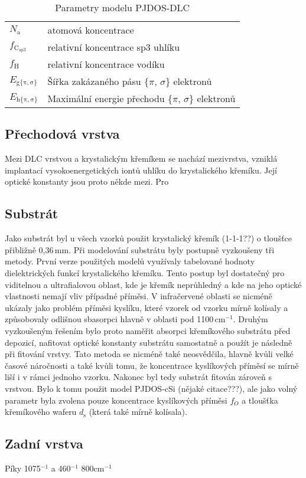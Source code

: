 \begin{table}
\centering
\begin{tabular}{l l}
\hline
$N_\mathrm{a}$ & atomová koncentrace \\
$f_\mathrm{C_{sp3}}$ & relativní koncentrace sp3 uhlíku \\
$f_\mathrm{H}$ & relativní koncentrace vodíku \\

$E_\mathrm{g\{\pi,\sigma\}}$ & Šířka zakázaného pásu \{$\pi$, $\sigma$\} elektronů\\
$E_\mathrm{h\{\pi,\sigma\}}$ & Maximální energie přechodu \{$\pi$, $\sigma$\} elektronů\\




\hline

\end{tabular}

\caption{Parametry modelu PJDOS-DLC}
\end{table}

\subsection{Přechodová vrstva}
Mezi DLC vrstvou a krystalickým křemíkem se nachází mezivrstva, vzniklá implantací vysokoenergetických iontů uhlíku do krystalického křemíku. Její optické konstanty jsou proto někde mezi. Pro  

\subsection{Substrát}
Jako substrát byl u všech vzorků použit krystalický křemík (1-1-1??) o tloušťce přibližně 0,36\,mm. Při modelování substrátu byly postupně vyzkoušeny tři metody. První verze použitých modelů využívaly tabelované hodnoty dielektrických funkcí krystalického křemíku. Tento postup byl dostatečný pro viditelnou a ultrafialovou oblast, kde je křemík neprůhledný a kde na jeho optické vlastnosti nemají vliv případné příměsi. V infračervené oblasti se nicméně ukázaly jako problém příměsi kyslíku, které vzorek od vzorku mírně kolísaly a způsobovaly odlišnou sbasorpci hlavně v oblasti pod 1100\,cm$^{-1}$. Druhým vyzkoušeným řešením bylo proto naměřit absorpci křemíkového substrátu před depozicí, nafitovat optické konstanty substrátu samostatně a použít je následně při fitování vrstvy. Tato metoda se nicméně také neosvědčila, hlavně kvůli velké časové náročnosti a také kvůli tomu, že koncentrace kyslíkových příměsí se mírně liší i v rámci jednoho vzorku.
Nakonec byl tedy substrát fitován zároveň s vrstvou. Bylo k tomu použit model PJDOS-cSi \cite{}(nějaké citace???), ale jako volný parametr byla zvolena pouze koncentrace kyslíkových příměsi $f_O$ a tloušťka křemíkového waferu $d_\mathrm{s}$ (která také mírně kolísala).  

\subsection{Zadní vrstva}
Píky 1075$^{-1}$ a 460$^{-1}$ 800cm$^{-1}$

\cleardoublepage

